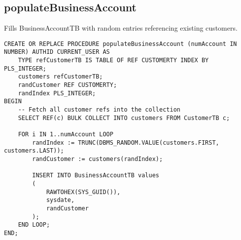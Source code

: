 \subsection*{populateBusinessAccount}
Fills BusinessAccountTB with random entries referencing existing customers.
\begin{lstlisting}
CREATE OR REPLACE PROCEDURE populateBusinessAccount (numAccount IN NUMBER) AUTHID CURRENT_USER AS
    TYPE refCustomerTB IS TABLE OF REF CUSTOMERTY INDEX BY PLS_INTEGER;
    customers refCustomerTB;
    randCustomer REF CUSTOMERTY;
    randIndex PLS_INTEGER;
BEGIN
    -- Fetch all customer refs into the collection
    SELECT REF(c) BULK COLLECT INTO customers FROM CustomerTB c;

    FOR i IN 1..numAccount LOOP
        randIndex := TRUNC(DBMS_RANDOM.VALUE(customers.FIRST, customers.LAST));
        randCustomer := customers(randIndex);

        INSERT INTO BusinessAccountTB values
        (
            RAWTOHEX(SYS_GUID()),
            sysdate,
            randCustomer
        );
    END LOOP;
END;
\end{lstlisting}

